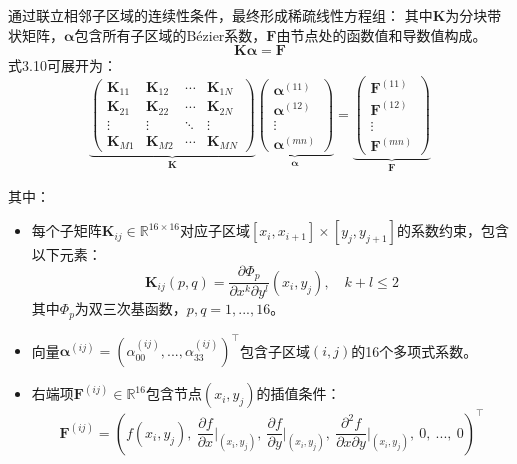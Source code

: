 通过联立相邻子区域的连续性条件，最终形成稀疏线性方程组：
其中$\mathbf{K}$为分块带状矩阵，$\boldsymbol{\alpha}$包含所有子区域的Bézier系数，$\mathbf{F}$由节点处的函数值和导数值构成。
\begin{equation}
    \mathbf{K}\boldsymbol{\alpha} = \mathbf{F}
\end{equation}
式3.10可展开为：
\begin{equation}
\underbrace{
\begin{pmatrix}
\mathbf{K}_{11} & \mathbf{K}_{12} & \cdots & \mathbf{K}_{1N} \\
\mathbf{K}_{21} & \mathbf{K}_{22} & \cdots & \mathbf{K}_{2N} \\
\vdots & \vdots & \ddots & \vdots \\
\mathbf{K}_{M1} & \mathbf{K}_{M2} & \cdots & \mathbf{K}_{MN}
\end{pmatrix}
}_{\mathbf{K}}
\underbrace{
\begin{pmatrix}
\boldsymbol{\alpha}^{(11)} \\
\boldsymbol{\alpha}^{(12)} \\
\vdots \\
\boldsymbol{\alpha}^{(mn)}
\end{pmatrix}
}_{\boldsymbol{\alpha}}
=
\underbrace{
\begin{pmatrix}
\mathbf{F}^{(11)} \\
\mathbf{F}^{(12)} \\
\vdots \\
\mathbf{F}^{(mn)}
\end{pmatrix}
}_{\mathbf{F}}
\end{equation}

其中：
\begin{itemize}
    \item 每个子矩阵$\mathbf{K}_{ij} \in \mathbb{R}^{16 \times 16}$对应子区域$[x_i,x_{i+1}]\times[y_j,y_{j+1}]$的系数约束，包含以下元素：
    \[
    \mathbf{K}_{ij}(p,q) = \frac{\partial \Phi_p}{\partial x^{k}\partial y^{l}}(x_i,y_j), \quad k+l \leq 2
    \]
    其中$\Phi_p$为双三次基函数，$p,q=1,...,16$。

    \item 向量$\boldsymbol{\alpha}^{(ij)} = (\alpha_{00}^{(ij)},...,\alpha_{33}^{(ij)})^\top$包含子区域$(i,j)$的16个多项式系数。

    \item 右端项$\mathbf{F}^{(ij)} \in \mathbb{R}^{16}$包含节点$(x_i,y_j)$的插值条件：
    \[
    \mathbf{F}^{(ij)} = \left(f(x_i,y_j),\ \frac{\partial f}{\partial x}\bigg|_{(x_i,y_j)},\ \frac{\partial f}{\partial y}\bigg|_{(x_i,y_j)},\ \frac{\partial^2 f}{\partial x\partial y}\bigg|_{(x_i,y_j)},\ 0,\ ...,\ 0\right)^\top
    \]
\end{itemize}

